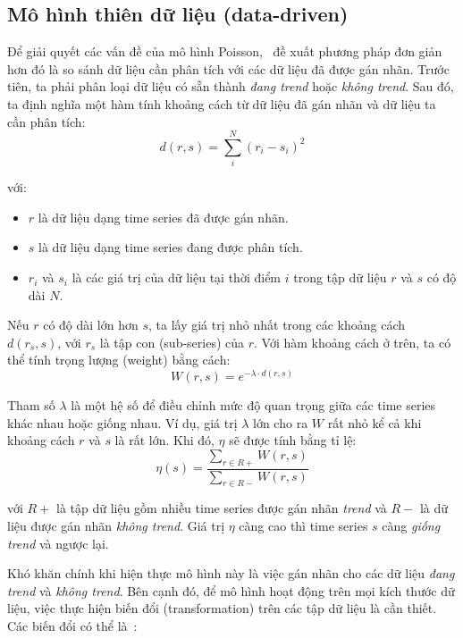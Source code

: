 \subsection{Mô hình thiên dữ liệu (data-driven)}
Để giải quyết các vấn đề của mô hình Poisson,
\cite{hendricksonTrendDetectionSocial2015}~đề xuất phương pháp đơn giản hơn đó
là so sánh dữ liệu cần phân tích với các dữ liệu đã được gán nhãn. Trước tiên,
ta phải phân loại dữ liệu có sẵn thành \textit{đang trend} hoặc \textit{không
trend}. Sau đó, ta định nghĩa một hàm tính khoảng cách từ dữ liệu đã gán nhãn
và dữ liệu ta cần phân tích:
\[ d(r, s)=\sum_{i}^{N}\left(r_{i}-s_{i}\right)^{2} \]

với:
\begin{itemize}
	\item $r$ là dữ liệu dạng time series đã được gán nhãn.
	\item $s$ là dữ liệu dạng time series đang được phân tích.
	\item $r_{i}$ và $s_{i}$ là các giá trị của dữ liệu tại thời điểm $i$ trong
	tập dữ liệu $r$ và $s$ có độ dài $N$.
\end{itemize}

Nếu $r$ có độ dài lớn hơn $s$, ta lấy giá trị nhỏ nhất trong các khoảng cách
$d(r_s, s)$, với $r_s$ là tập con (sub-series) của $r$. Với hàm khoảng cách ở
trên, ta có thể tính trọng lượng (weight) bằng cách:
\[ W(r,s)=e^{-\lambda \cdot d(r,s)} \]

Tham số $\lambda$ là một hệ số để điều chỉnh mức độ quan trọng giữa các time
series khác nhau hoặc giống nhau. Ví dụ, giá trị $\lambda$ lớn cho ra $W$ rất
nhỏ kể cả khi khoảng cách $r$ và $s$ là rất lớn. Khi đó, $\eta$ sẽ được tính
bằng tỉ lệ:
\[
\eta(s)=\frac{\sum_{r \in R+} W(r, s)}{\sum_{r \in R-} W(r, s)}
\]

với $R+$ là tập dữ liệu gồm nhiều time series được gán nhãn \textit{trend} và
$R-$ là dữ liệu được gán nhãn \textit{không trend}. Giá trị $\eta$ càng cao thì
time series $s$ càng \textit{giống trend} và ngược lại.

Khó khăn chính khi hiện thực mô hình này là việc gán nhãn cho các dữ liệu
\textit{đang trend} và \textit{không trend}. Bên cạnh đó, để mô hình hoạt động
trên mọi kích thước dữ liệu, việc thực hiện biến đổi (transformation) trên các
tập dữ liệu là cần thiết. Các biến đổi có thể là~\cite{nikolovTrendNoTrend2012}:

